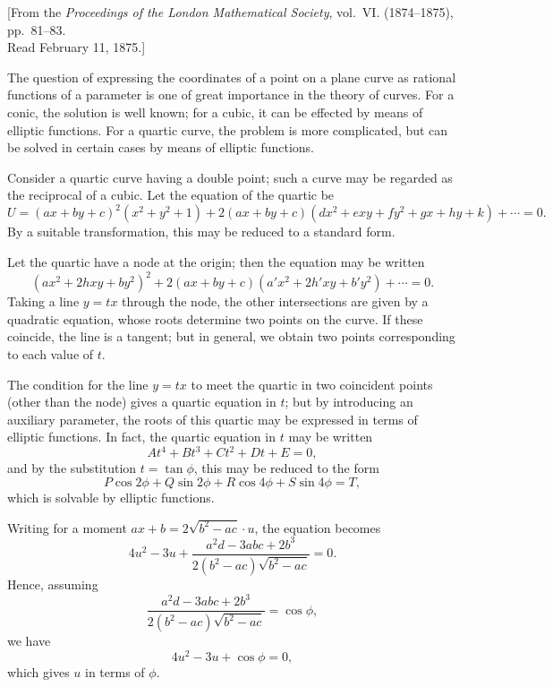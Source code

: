 \documentclass[11pt,a4paper]{book}
\begin{document}
\begin{center}
{\small [From the \textit{Proceedings of the London Mathematical Society}, vol.~VI. (1874--1875), pp.~81--83.\\
Read February 11, 1875.]}
\end{center}

\begin{art}
The question of expressing the coordinates of a point on a plane curve as rational functions of a parameter is one of great importance in the theory of curves. For a conic, the solution is well known; for a cubic, it can be effected by means of elliptic functions. For a quartic curve, the problem is more complicated, but can be solved in certain cases by means of elliptic functions.
\end{art}

\begin{art}
Consider a quartic curve having a double point; such a curve may be regarded as the reciprocal of a cubic. Let the equation of the quartic be
\[
U = (ax + by + c)^2(x^2 + y^2 + 1) + 2(ax + by + c)(dx^2 + exy + fy^2 + gx + hy + k) + \cdots = 0.
\]
By a suitable transformation, this may be reduced to a standard form.
\end{art}

\begin{art}
Let the quartic have a node at the origin; then the equation may be written
\[
(ax^2 + 2hxy + by^2)^2 + 2(ax + by + c)(a'x^2 + 2h'xy + b'y^2) + \cdots = 0.
\]
Taking a line $y = tx$ through the node, the other intersections are given by a quadratic equation, whose roots determine two points on the curve. If these coincide, the line is a tangent; but in general, we obtain two points corresponding to each value of $t$.
\end{art}

\begin{art}
The condition for the line $y = tx$ to meet the quartic in two coincident points (other than the node) gives a quartic equation in $t$; but by introducing an auxiliary parameter, the roots of this quartic may be expressed in terms of elliptic functions. In fact, the quartic equation in $t$ may be written
\[
At^4 + Bt^3 + Ct^2 + Dt + E = 0,
\]
and by the substitution $t = \tan\phi$, this may be reduced to the form
\[
P\cos 2\phi + Q\sin 2\phi + R\cos 4\phi + S\sin 4\phi = T,
\]
which is solvable by elliptic functions.
\end{art}

\begin{art}
Writing for a moment $ax + b = 2\sqrt{b^2-ac} \cdot u$, the equation becomes
\[
4u^2 - 3u + \frac{a^2d - 3abc + 2b^3}{2(b^2-ac)\sqrt{b^2-ac}} = 0.
\]
Hence, assuming
\[
\frac{a^2d - 3abc + 2b^3}{2(b^2-ac)\sqrt{b^2-ac}} = \cos\phi,
\]
we have
\[
4u^2 - 3u + \cos\phi = 0,
\]
which gives $u$ in terms of $\phi$.
\end{art}
\end{document}
